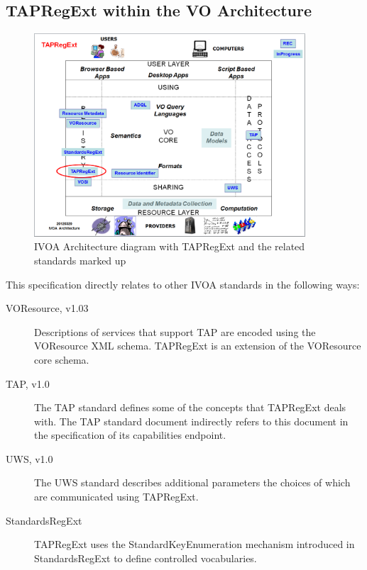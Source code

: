 \documentclass{ivoa}
\begin{document}
\subsection{TAPRegExt within the VO Architecture}

\label{architecture}

\begin{figure}[thm]
\begin{center}
\includegraphics[width=0.9\textwidth]{TAPRegExt-arch.png}
\end{center}
\caption{IVOA Architecture diagram with TAPRegExt and
the related standards marked up}
\label{fig:arch}
\end{figure}

This specification directly relates to other IVOA standards in the following
ways:


\begin{description}
\item[VOResource, v1.03 \citep{std:VOR}] Descriptions of services that support TAP are encoded
using the VOResource XML schema. TAPRegExt is an extension 
of the VOResource core schema.
\item[TAP, v1.0 \citep{std:TAP}]The TAP standard defines some of the concepts that TAPRegExt
deals with. The TAP standard document indirectly
refers to this document in the specification of its capabilities endpoint.
\item[UWS, v1.0 \citep{std:UWS}]The UWS standard describes additional parameters the choices 
of which are communicated using TAPRegExt.
\item[StandardsRegExt \citep{std:STDREGEXT}] TAPRegExt uses the StandardKeyEnumeration mechanism introduced
in StandardsRegExt to define controlled vocabularies.

\end{description}
\end{document}
